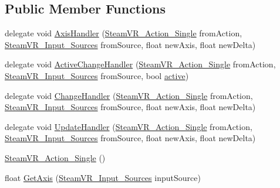 \subsection*{Public Member Functions}
\begin{DoxyCompactItemize}
\item 
delegate void \mbox{\hyperlink{class_valve_1_1_v_r_1_1_steam_v_r___action___single_a4193937cd6b6e4b7248374bc5636f6fd}{Axis\+Handler}} (\mbox{\hyperlink{class_valve_1_1_v_r_1_1_steam_v_r___action___single}{Steam\+V\+R\+\_\+\+Action\+\_\+\+Single}} from\+Action, \mbox{\hyperlink{namespace_valve_1_1_v_r_a82e5bf501cc3aa155444ee3f0662853f}{Steam\+V\+R\+\_\+\+Input\+\_\+\+Sources}} from\+Source, float new\+Axis, float new\+Delta)
\item 
delegate void \mbox{\hyperlink{class_valve_1_1_v_r_1_1_steam_v_r___action___single_a45ad70dbb8a58191f373b7ae098b833b}{Active\+Change\+Handler}} (\mbox{\hyperlink{class_valve_1_1_v_r_1_1_steam_v_r___action___single}{Steam\+V\+R\+\_\+\+Action\+\_\+\+Single}} from\+Action, \mbox{\hyperlink{namespace_valve_1_1_v_r_a82e5bf501cc3aa155444ee3f0662853f}{Steam\+V\+R\+\_\+\+Input\+\_\+\+Sources}} from\+Source, bool \mbox{\hyperlink{interface_valve_1_1_v_r_1_1_i_steam_v_r___action___source_a529749f5fa62c29a4faac767cd9ece8d}{active}})
\item 
delegate void \mbox{\hyperlink{class_valve_1_1_v_r_1_1_steam_v_r___action___single_ae0c72c83dccd88a0235e8a831d62116e}{Change\+Handler}} (\mbox{\hyperlink{class_valve_1_1_v_r_1_1_steam_v_r___action___single}{Steam\+V\+R\+\_\+\+Action\+\_\+\+Single}} from\+Action, \mbox{\hyperlink{namespace_valve_1_1_v_r_a82e5bf501cc3aa155444ee3f0662853f}{Steam\+V\+R\+\_\+\+Input\+\_\+\+Sources}} from\+Source, float new\+Axis, float new\+Delta)
\item 
delegate void \mbox{\hyperlink{class_valve_1_1_v_r_1_1_steam_v_r___action___single_a1514666eabcafba498274e8d6cee2a40}{Update\+Handler}} (\mbox{\hyperlink{class_valve_1_1_v_r_1_1_steam_v_r___action___single}{Steam\+V\+R\+\_\+\+Action\+\_\+\+Single}} from\+Action, \mbox{\hyperlink{namespace_valve_1_1_v_r_a82e5bf501cc3aa155444ee3f0662853f}{Steam\+V\+R\+\_\+\+Input\+\_\+\+Sources}} from\+Source, float new\+Axis, float new\+Delta)
\item 
\mbox{\hyperlink{class_valve_1_1_v_r_1_1_steam_v_r___action___single_a2d51af077b79d68b587a6e13f3d57cac}{Steam\+V\+R\+\_\+\+Action\+\_\+\+Single}} ()
\item 
float \mbox{\hyperlink{class_valve_1_1_v_r_1_1_steam_v_r___action___single_a3b78812c9a7bea43b8d64440d5f4b339}{Get\+Axis}} (\mbox{\hyperlink{namespace_valve_1_1_v_r_a82e5bf501cc3aa155444ee3f0662853f}{Steam\+V\+R\+\_\+\+Input\+\_\+\+Sources}} input\+Source)

\end{DoxyCompactItemize}
